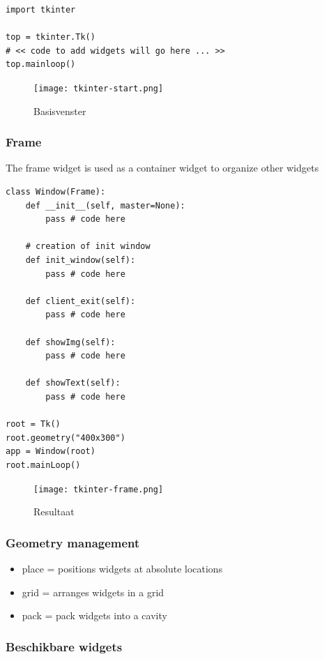 \documentclass{article}
\begin{document}
\begin{verbatim}
import tkinter

top = tkinter.Tk()
# << code to add widgets will go here ... >>
top.mainloop()
\end{verbatim}


\begin{figure}[H]
    \centering
    \texttt{[image: tkinter-start.png]}
    \caption{Basisvenster}
\end{figure}

\subsubsection{Frame}

The frame widget is used as a container widget to organize other widgets

\begin{verbatim}
class Window(Frame):
    def __init__(self, master=None):
        pass # code here

    # creation of init window
    def init_window(self):
        pass # code here

    def client_exit(self):
        pass # code here

    def showImg(self):
        pass # code here

    def showText(self):
        pass # code here

root = Tk()
root.geometry("400x300")
app = Window(root)
root.mainLoop()
\end{verbatim}

\begin{figure}[H]
    \centering
    \texttt{[image: tkinter-frame.png]}
    \caption{Resultaat}
\end{figure}

\subsubsection{Geometry management}

\begin{itemize}
    \item place = positions widgets at absolute locations
    \item grid = arranges widgets in a grid
    \item pack = pack widgets into a cavity
\end{itemize}

\subsubsection{Beschikbare widgets}
\end{document}
